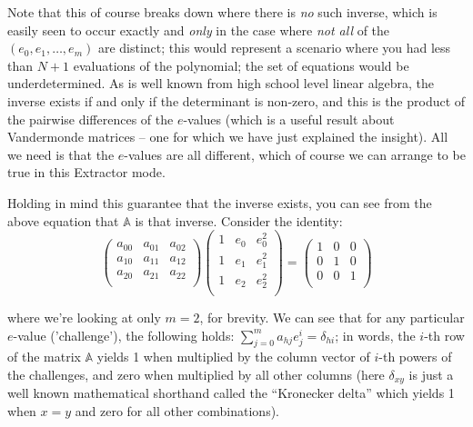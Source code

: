 \documentclass[10pt,a4paper]{article}
\begin{document}
Note that this of course breaks down where there is \emph{no} such
inverse, which is easily seen to occur exactly and \emph{only} in the
case where \emph{not all }of the $(e_0, e_1, \ldots , e_m)$ are distinct; this would represent a
scenario where you had less than $N+1$ evaluations of the polynomial; the set
of equations would be underdetermined. As is well known from high school
level linear algebra, the inverse exists if and only if the determinant
is non-zero, and this is the product of the pairwise differences of the
$e$-values (which is a useful result about Vandermonde matrices -- one for
which we have just explained the insight). All we need is that the
$e$-values are all different, which of course we can arrange to be true in
this Extractor mode.

Holding in mind this guarantee that the inverse exists, you can see from
the above equation that $\mathbb{A}$ is that inverse. Consider the identity:
\[
\begin{pmatrix}
a_{00} & a_{01} &a_{02} \\
a_{10} & a_{11} &a_{12} \\
a_{20} & a_{21} &a_{22} \\
\end{pmatrix}
\begin{pmatrix}
1 & e_0 & e_0^2\\
1 & e_1 & e_1^2\\
1 & e_2 & e_2^2\\
\end{pmatrix}
=\begin{pmatrix}
1 & 0 &0 \\
0 & 1 &0 \\
0 & 0 &1 \\
\end{pmatrix}
\]

where we're looking at only $m=2$, for brevity. We can see that for any
particular $e$-value ('challenge'), the following holds: $\sum_{j=0}^{m} a_{hj}e_j^{i} = \delta_{hi}$; in words, the
$i$-th row of the matrix $\mathbb{A}$ yields 1 when multiplied by the column vector of
$i$-th powers of the challenges, and zero when multiplied by all other
columns (here $\delta_{xy}$ is just a well known mathematical shorthand called the
``Kronecker delta'' which yields 1 when $x=y$ and zero for all other
combinations).
\end{document}
